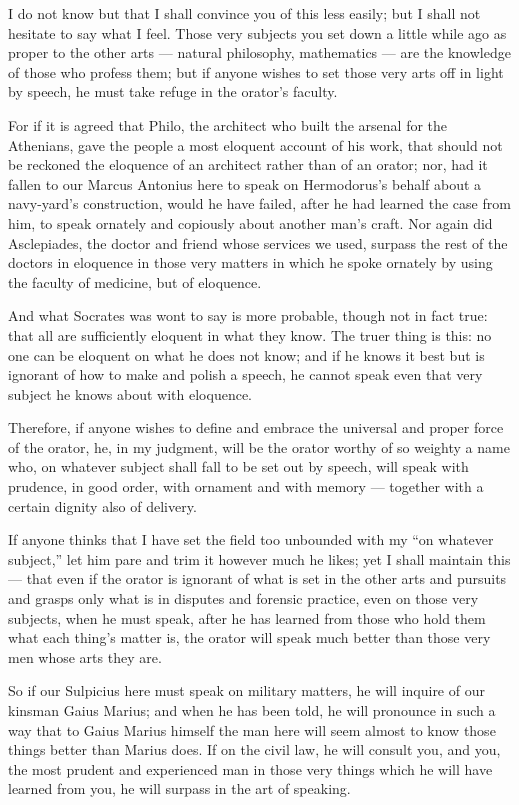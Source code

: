  I do not know but that I shall convince you of this less easily; but I shall not hesitate to say what I feel. Those very subjects you set down a little while ago as proper to the other arts — natural philosophy, mathematics — are the knowledge of those who profess them; but if anyone wishes to set those very arts off in light by speech, he must take refuge in the orator's faculty.

 For if it is agreed that Philo, the architect who built the arsenal for the Athenians, gave the people a most eloquent account of his work, that should not be reckoned the eloquence of an architect rather than of an orator; nor, had it fallen to our Marcus Antonius here to speak on Hermodorus's behalf about a navy-yard's construction, would he have failed, after he had learned the case from him, to speak ornately and copiously about another man's craft. Nor again did Asclepiades, the doctor and friend whose services we used, surpass the rest of the doctors in eloquence in those very matters in which he spoke ornately by using the faculty of medicine, but of eloquence.

 And what Socrates was wont to say is more probable, though not in fact true: that all are sufficiently eloquent in what they know. The truer thing is this: no one can be eloquent on what he does not know; and if he knows it best but is ignorant of how to make and polish a speech, he cannot speak even that very subject he knows about with eloquence.

 Therefore, if anyone wishes to define and embrace the universal and proper force of the orator, he, in my judgment, will be the orator worthy of so weighty a name who, on whatever subject shall fall to be set out by speech, will speak with prudence, in good order, with ornament and with memory — together with a certain dignity also of delivery.

 If anyone thinks that I have set the field too unbounded with my ``on whatever subject,'' let him pare and trim it however much he likes; yet I shall maintain this — that even if the orator is ignorant of what is set in the other arts and pursuits and grasps only what is in disputes and forensic practice, even on those very subjects, when he must speak, after he has learned from those who hold them what each thing's matter is, the orator will speak much better than those very men whose arts they are.

 So if our Sulpicius here must speak on military matters, he will inquire of our kinsman Gaius Marius; and when he has been told, he will pronounce in such a way that to Gaius Marius himself the man here will seem almost to know those things better than Marius does. If on the civil law, he will consult you, and you, the most prudent and experienced man in those very things which he will have learned from you, he will surpass in the art of speaking.

